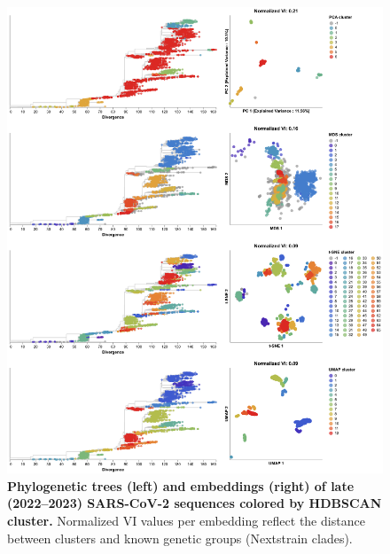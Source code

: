 \documentclass[webpdf,contemporary,large,single]{oup-authoring-template}%
\theoremstyle{thmstyleone}%
\theoremstyle{thmstyletwo}%
\theoremstyle{thmstylethree}%
\begin{document}
\begin{figure}[!h]
\includegraphics[width=0.9\columnwidth]{figures/sarscov2-test-embeddings-by-cluster-vs-Nextstrain_clade.png}
\caption{{\bf Phylogenetic trees (left) and embeddings (right) of late (2022--2023) SARS-CoV-2 sequences colored by HDBSCAN cluster.}
  Normalized VI values per embedding reflect the distance between clusters and known genetic groups (Nextstrain clades).
}
\label{fig:sars-cov-2-2022-2023-clusters-vs-Nextstrain-clade}
\end{figure}
\end{document}
